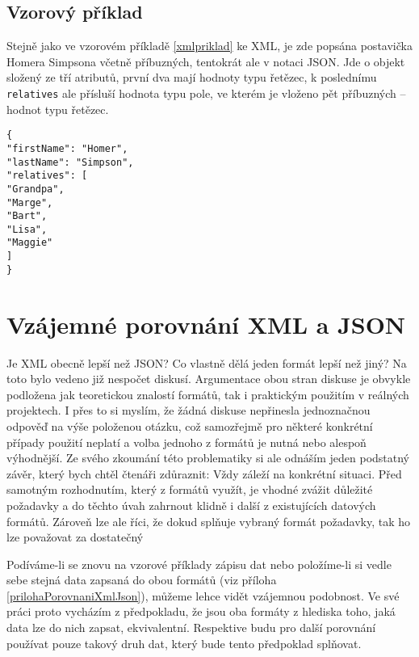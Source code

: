 \subsection{Vzorový příklad}
Stejně jako ve vzorovém příkladě \ref{xmlpriklad} ke XML, je zde popsána postavička Homera Simpsona včetně příbuzných, tentokrát ale v notaci JSON. Jde o objekt složený ze tří atributů, první dva mají hodnoty typu řetězec, k poslednímu \texttt{relatives} ale přísluší hodnota typu pole, ve kterém je vloženo pět příbuzných -- hodnot typu řetězec.

\texttt{\small\{\\
\hspace*{2mm}"firstName": "Homer",\\
\hspace*{2mm}"lastName": "Simpson",\\
\hspace*{2mm}"relatives": [\\
\hspace*{4mm}"Grandpa",\\
\hspace*{4mm}"Marge",\\
\hspace*{4mm}"Bart",\\
\hspace*{4mm}"Lisa",\\
\hspace*{4mm}"Maggie"\\
\hspace*{2mm}]\\
\} }

\section{Vzájemné porovnání XML a JSON}


Je XML obecně lepší než JSON? Co vlastně dělá jeden formát lepší než jiný? Na toto bylo vedeno již nespočet diskusí. Argumentace obou stran diskuse je obvykle podložena jak teoretickou znalostí formátů, tak i praktickým použitím v reálných projektech. I přes to si myslím, že žádná diskuse nepřinesla jednoznačnou odpověď na výše položenou otázku, což samozřejmě pro některé konkrétní případy použití neplatí a volba jednoho z formátů je nutná nebo alespoň výhodnější. Ze svého zkoumání této problematiky si ale odnáším jeden podstatný závěr, který bych chtěl čtenáři zdůraznit: Vždy záleží na konkrétní situaci. Před samotným rozhodnutím, který z formátů využít, je vhodné zvážit důležité požadavky a do těchto úvah zahrnout klidně i další z existujících datových formátů. Zároveň lze ale říci, že dokud splňuje vybraný formát požadavky, tak ho lze považovat za dostatečný 

Podíváme-li se znovu na vzorové příklady zápisu dat nebo položíme-li si vedle sebe stejná data zapsaná do obou formátů (viz příloha \ref{prilohaPorovnaniXmlJson}), můžeme lehce vidět vzájemnou podobnost. Ve své práci proto vycházím z předpokladu, že jsou oba formáty z hlediska toho, jaká data lze do nich zapsat, ekvivalentní. Respektive budu pro další porovnání používat pouze takový druh dat, který bude tento předpoklad splňovat.